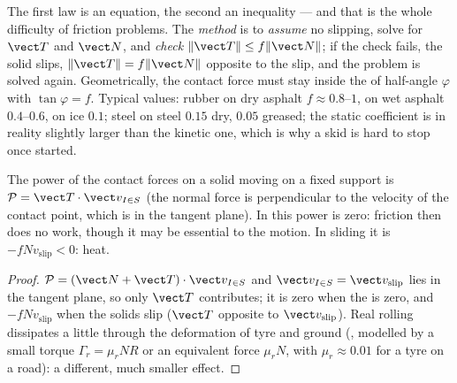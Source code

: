 \begin{remark}\label{rem:b2:rigid-body-mechanics:reading}
The first law is an equation, the second an inequality --- and that is
the whole difficulty of friction problems. The \emph{method} is to
\emph{assume} no slipping, solve for $\vect T$ and $\vect N$, and
\emph{check} $\|\vect T\| \le f\|\vect N\|$; if the check fails, the
solid slips, $\|\vect T\| = f\|\vect N\|$ opposite to the slip, and the
problem is solved again. Geometrically, the contact force must stay
inside the \emph{} of half-angle $\varphi$ with $\tan\varphi
= f$. Typical values: rubber on dry asphalt $f \approx 0.8$--$1$, on wet
asphalt $0.4$--$0.6$, on ice $0.1$; steel on steel $0.15$ dry, $0.05$
greased; the static coefficient is in reality slightly larger than the
kinetic one, which is why a skid is hard to stop once started.
\end{remark}

\begin{proposition}\label{prop:b2:rigid-body-mechanics:power}
The power of the contact forces on a solid moving on a fixed support is
$\mathcal P = \vect T\cdot\vect v_{I\in S}$ (the normal force is
perpendicular to the velocity of the contact point, which is in the
tangent plane). In \emph{} this power is zero:
friction then does no work, though it may be essential to the motion.
In sliding it is $-f N v_{\text{slip}} < 0$: heat.
\end{proposition}

\begin{proof}
$\mathcal P = (\vect N + \vect T)\cdot\vect v_{I\in S}$ and $\vect
v_{I\in S} = \vect v_{\text{slip}}$ lies in the tangent plane, so only
$\vect T$ contributes; it is zero when the  is zero, and
$-fNv_{\text{slip}}$ when the solids slip ($\vect T$ opposite to $\vect
v_{\text{slip}}$). Real rolling dissipates a little through the
deformation of tyre and ground (\emph{}, modelled by a
small torque $\Gamma_r = \mu_rNR$ or an equivalent force $\mu_rN$, with
$\mu_r \approx 0.01$ for a tyre on a road): a different, much smaller
effect.
\end{proof}

